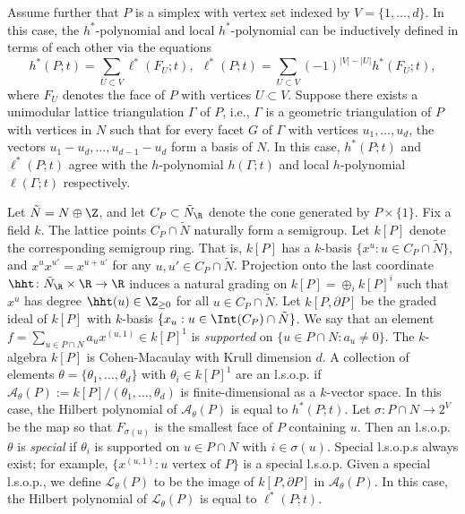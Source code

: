 Assume further that $P$ is a simplex with vertex set indexed by $V = \{ 1, \ldots, d\}$. In this case, the $h^*$-polynomial and local $h^*$-polynomial can be inductively defined in terms of each other via the equations
\[
h^*(P;t) = \sum_{U \subset V} \ell^*(F_U;t),\: \: \ell^*(P;t) = \sum_{U \subset V}  (-1)^{|V| - |U|} h^*(F_U;t),
\]
where $F_U$ denotes the face of $P$ with vertices $U \subset V$.  
Suppose 
there exists a unimodular lattice triangulation $\Gamma$ of $P$, i.e., $\Gamma$ is a geometric triangulation of $P$ with vertices in $N$ such that for every facet $G$ of $\Gamma$ with vertices $u_1,\ldots,u_{d}$, the vectors $u_1 - u_{d}, \ldots,u_{d - 1} - u_{d}$ form a basis of $N$.  In this case, $h^*(P;t)$ and $\ell^*(P;t)$ agree with the $h$-polynomial $h(\Gamma;t)$ and local $h$-polynomial $\ell(\Gamma;t)$ respectively. 


Let $\tilde{N} = N \oplus \Z$, and let 
$C_P \subset \tilde{N}_\R$ denote the cone generated by $P \times \{1\}$. 
Fix a field $k$. The lattice points $C_P \cap \tilde{N}$ naturally form a semigroup. Let $k[P]$ denote the corresponding semigroup ring. That is, $k[P]$ has a $k$-basis $\{ x^u : u \in C_P \cap \tilde{N}\}$, and $x^{u} x^{u'} = x^{u + u'}$ for any $u,u' \in C_P \cap \tilde{N}$. Projection onto the last coordinate $\hht \colon \tilde{N}_\R \times \R \to \R$  induces a natural grading on $k[P] = \oplus_i k[P]^i$ such that $x^u$ has degree  $\hht(u) \in \Z_{\ge 0}$ for all $u \in C_P \cap \tilde{N}$. 
Let $k[P, \partial P]$ be the graded ideal of $k[P]$ with $k$-basis $\{ x_u : u \in \Int(C_P) \cap \tilde{N}\}$. 
We say that an element $f = \sum_{u \in P \cap N} a_u x^{(u,1)} \in k[P]^1$ is \emph{supported} on $\{ u \in P \cap N : a_u \neq 0 \}$. 
The $k$-algebra $k[P]$ is Cohen-Macaulay with Krull dimension $d$. A collection of 
elements $ \theta = \{ \theta_1,\ldots,\theta_d \}$ with $\theta_i \in k[P]^1$ are an l.s.o.p. if $\mathscr{A}_\theta(P) := k[P]/(\theta_1, \dotsc, \theta_d)$ is finite-dimensional as a $k$-vector space. In this case, the Hilbert polynomial of $\mathscr{A}_\theta(P)$ is equal to $h^*(P;t)$. 
Let
$\sigma \colon  P \cap N \to  2^V$
be the map so that $F_{\sigma(u)}$ is the smallest face of $P$ containing $u$. Then an l.s.o.p. $\theta$ is \emph{special} if  $\theta_i$ is supported on $u \in P \cap N$ with $i \in \sigma(u)$. Special l.s.o.p.s always exist; for example, $\{ x^{(u,1)} : u \textrm{ vertex of } P \}$ is a special l.s.o.p. Given a special l.s.o.p., we define  $\mathscr{L}_{\theta}(P)$ to be the image of $k[P, \partial P]$ in $\mathscr{A}_\theta(P)$. In this case, the Hilbert polynomial of $\mathscr{L}_\theta(P)$ is equal to $\ell^*(P;t)$.  

